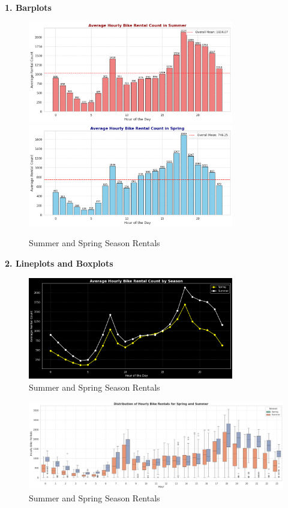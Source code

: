 \documentclass[12pt, letterpaper]{article}
\begin{document}
\textbf{1. Barplots}
\begin{figure}[h]

    \centering
    \includegraphics[width=0.8\textwidth]{summer1.png}
    \includegraphics[width=0.8\textwidth]{spring1.png}
    \caption{Summer and Spring Season Rentals}

\end{figure}

\textbf{2. Lineplots and Boxplots}
\begin{figure}[h]

    \centering
    \includegraphics[width=0.8\textwidth]{lineplot1.png}
    \caption{Summer and Spring Season Rentals}

\end{figure}

\begin{figure}[h]

    \centering
    \includegraphics[width=1\textwidth]{boxplot.png}
    \caption{Summer and Spring Season Rentals}

\end{figure}
\end{document}

